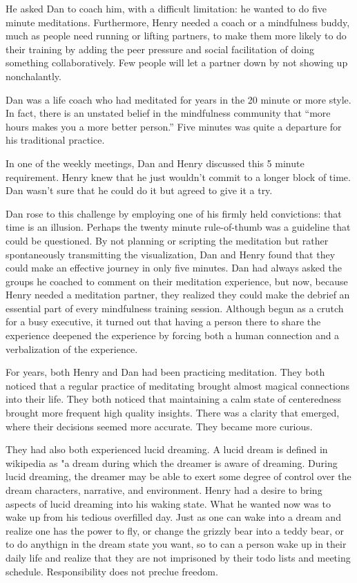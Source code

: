 \documentclass[12pt]{book}
\begin{document}
He asked Dan to coach him, with a difficult limitation: he wanted to
do five minute meditations. Furthermore, Henry needed a coach or a
mindfulness buddy, much as people need running or lifting partners, to
make them more likely to do their training by adding the peer pressure
and social facilitation of doing something collaboratively. Few people
will let a partner down by not showing up nonchalantly.

Dan was a life coach who had meditated for years in the
20 minute or more style.  In fact, there is an unstated
belief in the mindfulness community that ``more hours makes
you a more better person.'' Five minutes was quite a
departure for his traditional practice.

In one of the weekly meetings, Dan and Henry discussed this 5 minute requirement. Henry knew that he just wouldn't commit to a longer block of time. Dan wasn't sure that he could do it but agreed to give it a try. 

Dan rose to this challenge by employing one of his firmly held convictions: that time is an illusion.
Perhaps the twenty minute rule-of-thumb was a guideline that could be questioned.
By not planning or scripting the meditation but rather spontaneously transmitting
the visualization, Dan and Henry found that they could
make an effective journey in only five minutes.
Dan had always asked the groups he coached to comment on
their meditation experience, but now, because Henry needed a
meditation partner, they realized they could make the debrief
an essential part of every mindfulness training session.
Although begun as a crutch for a busy executive, it turned
out that having a person there to share the experience deepened
the experience by forcing both a human connection and a verbalization
of the experience.

For years, both Henry and Dan had been practicing meditation. They
both noticed that a regular practice of meditating brought almost
magical connections into their life. They both noticed that
maintaining a calm state of centeredness brought more frequent high
quality insights. There was a clarity that emerged, where their
decisions seemed more accurate. They became more curious.

They had also both experienced lucid dreaming. A lucid dream is
defined in wikipedia as "a dream during which the dreamer is aware of
dreaming. During lucid dreaming, the dreamer may be able to exert some
degree of control over the dream characters, narrative, and
environment. Henry had a desire to bring aspects of lucid dreaming
into his waking state.  What he wanted now was to wake up from his
tedious overfilled day. Just as one can wake into a dream and realize
one has the power to fly, or change the grizzly bear into a teddy
bear, or to do anythign in the dream state you want, so to can a
person wake up in their daily life and realize that they are not
imprisoned by their todo lists and meeting schedule. Responsibility
does not preclue freedom.
\end{document}
